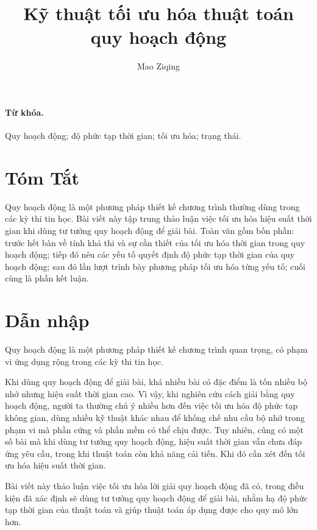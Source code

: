 \documentclass[11pt]{article}
\title{Kỹ thuật tối ưu hóa thuật toán quy hoạch động}
\author{Mao Ziqing}
\date{}
\begin{document}
\maketitle


\paragraph{Từ khóa.}
Quy hoạch động; độ phức tạp thời gian; tối ưu hóa; trạng thái.

\section*{Tóm Tắt}

Quy hoạch động là một phương pháp thiết kế chương trình thường dùng trong các
kỳ thi tin học. Bài viết này tập trung thảo luận việc tối ưu hóa hiệu suất
thời gian khi dùng tư tưởng quy hoạch động để giải bài. Toàn văn gồm bốn
phần: trước hết bàn về tính khả thi và sự cần thiết của tối ưu hóa thời gian
trong quy hoạch động; tiếp đó nêu các yếu tố quyết định độ phức tạp thời gian
của quy hoạch động; sau đó lần lượt trình bày phương pháp tối ưu hóa từng yếu
tố; cuối cùng là phần kết luận.

\tableofcontents

\section{Dẫn nhập}

Quy hoạch động là một phương pháp thiết kế chương trình quan trọng, có phạm vi
ứng dụng rộng trong các kỳ thi tin học.

Khi dùng quy hoạch động để giải bài, khá nhiều bài có đặc điểm là tốn nhiều
bộ nhớ nhưng hiệu suất thời gian cao. Vì vậy, khi nghiên cứu cách giải bằng
quy hoạch động, người ta thường chú ý nhiều hơn đến việc tối ưu hóa độ phức
tạp không gian, dùng nhiều kỹ thuật khác nhau để khống chế nhu cầu bộ nhớ
trong phạm vi mà phần cứng và phần mềm có thể chịu được. Tuy nhiên, cũng có
một số bài mà khi dùng tư tưởng quy hoạch động, hiệu suất thời gian vẫn chưa
đáp ứng yêu cầu, trong khi thuật toán còn khả năng cải tiến. Khi đó cần xét
đến tối ưu hóa hiệu suất thời gian.

Bài viết này thảo luận việc tối ưu hóa lời giải quy hoạch động đã có, trong
điều kiện đã xác định sẽ dùng tư tưởng quy hoạch động để giải bài, nhằm hạ độ
phức tạp thời gian của thuật toán và giúp thuật toán áp dụng được cho quy mô
lớn hơn.
\end{document}

